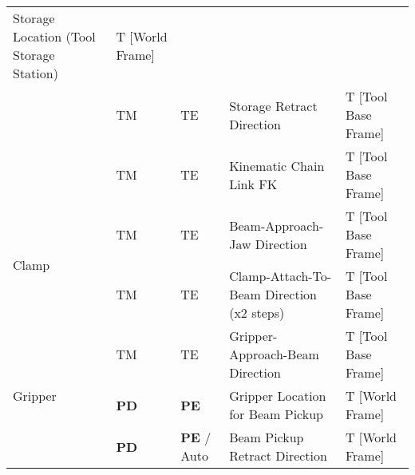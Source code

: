 \begin{table}[H]
\begin{adjustbox}{max width=\textwidth}
\begin{tabular}{p{2.09cm}p{1.51cm}p{1.93cm}p{5.92cm}p{4.48cm}}
\multicolumn{1}{|p{5.92cm}}{{\footnotesize Storage Location (Tool Storage Station)}} & 
\multicolumn{1}{|p{4.48cm}|}{{\footnotesize T [World Frame]}} \\ 
\hhline{~----}
\multicolumn{1}{|p{2.09cm}}{} & 
\multicolumn{1}{|p{1.51cm}}{{\footnotesize TM}} & 
\multicolumn{1}{|p{1.93cm}}{{\footnotesize TE}} & 
\multicolumn{1}{|p{5.92cm}}{{\footnotesize Storage Retract Direction}} & 
\multicolumn{1}{|p{4.48cm}|}{{\footnotesize T [Tool Base Frame]}} \\ 
\hhline{~----}
\multicolumn{1}{|p{2.09cm}}{} & 
\multicolumn{1}{|p{1.51cm}}{{\footnotesize TM}} & 
\multicolumn{1}{|p{1.93cm}}{{\footnotesize TE}} & 
\multicolumn{1}{|p{5.92cm}}{{\footnotesize Kinematic Chain Link FK }} & 
\multicolumn{1}{|p{4.48cm}|}{{\footnotesize T [Tool Base Frame]}} \\ 
\hline
\multicolumn{1}{|p{2.09cm}}{\multirow{2}{*}{\parbox{2.09cm}{{\footnotesize Clamp}}}} & 
\multicolumn{1}{|p{1.51cm}}{{\footnotesize TM}} & 
\multicolumn{1}{|p{1.93cm}}{{\footnotesize TE}} & 
\multicolumn{1}{|p{5.92cm}}{{\footnotesize Beam-Approach-Jaw Direction }} & 
\multicolumn{1}{|p{4.48cm}|}{{\footnotesize T [Tool Base Frame]}} \\ 
\hhline{~----}
\multicolumn{1}{|p{2.09cm}}{} & 
\multicolumn{1}{|p{1.51cm}}{{\footnotesize TM}} & 
\multicolumn{1}{|p{1.93cm}}{{\footnotesize TE}} & 
\multicolumn{1}{|p{5.92cm}}{{\footnotesize Clamp-Attach-To-Beam Direction (x2 steps)}} & 
\multicolumn{1}{|p{4.48cm}|}{{\footnotesize T [Tool Base Frame]}} \\ 
\hline
\multicolumn{1}{|p{2.09cm}}{\multirow{3}{*}{\parbox{2.09cm}{{\footnotesize Gripper}}}} & 
\multicolumn{1}{|p{1.51cm}}{{\footnotesize TM}} & 
\multicolumn{1}{|p{1.93cm}}{{\footnotesize TE}} & 
\multicolumn{1}{|p{5.92cm}}{{\footnotesize Gripper-Approach-Beam Direction}} & 
\multicolumn{1}{|p{4.48cm}|}{{\footnotesize T [Tool Base Frame]}} \\ 
\hhline{~----}
\multicolumn{1}{|p{2.09cm}}{} & 
\multicolumn{1}{|p{1.51cm}}{{\footnotesize \textbf{PD}}} & 
\multicolumn{1}{|p{1.93cm}}{{\footnotesize \textbf{PE}}} & 
\multicolumn{1}{|p{5.92cm}}{{\footnotesize Gripper Location for Beam Pickup}} & 
\multicolumn{1}{|p{4.48cm}|}{{\footnotesize T [World Frame]}} \\ 
\hhline{~----}
\multicolumn{1}{|p{2.09cm}}{} & 
\multicolumn{1}{|p{1.51cm}}{{\footnotesize \textbf{PD}}} & 
\multicolumn{1}{|p{1.93cm}}{{\footnotesize \textbf{PE }/ Auto}} & 
\multicolumn{1}{|p{5.92cm}}{{\footnotesize Beam Pickup Retract Direction}} & 
\multicolumn{1}{|p{4.48cm}|}{{\footnotesize T [World Frame]}} \\ 

\end{tabular}
\end{adjustbox}
\end{table}
